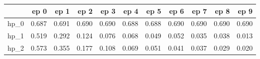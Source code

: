 \begin{tabular}{lrrrrrrrrrr}
\toprule
{} &   ep 0 &   ep 1 &   ep 2 &   ep 3 &   ep 4 &   ep 5 &   ep 6 &   ep 7 &   ep 8 &   ep 9 \\
\midrule
hp\_0 &  0.687 &  0.691 &  0.690 &  0.690 &  0.688 &  0.688 &  0.690 &  0.690 &  0.690 &  0.690 \\
hp\_1 &  0.519 &  0.292 &  0.124 &  0.076 &  0.068 &  0.049 &  0.052 &  0.035 &  0.038 &  0.013 \\
hp\_2 &  0.573 &  0.355 &  0.177 &  0.108 &  0.069 &  0.051 &  0.041 &  0.037 &  0.029 &  0.020 \\
\bottomrule
\end{tabular}
